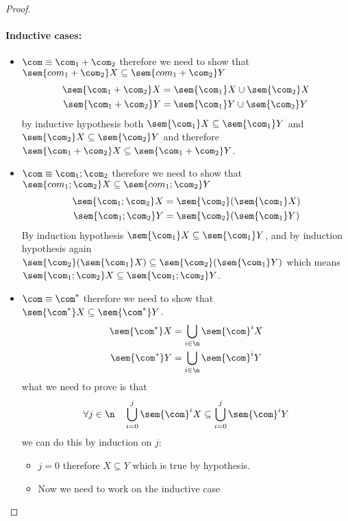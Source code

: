 \begin{proof}
  \paragraph*{Inductive cases: \\}
  \begin{itemize}
  \item \(\com \equiv \com_1 + \com_2\) therefore we need to show that
    \(\sem{com_1+\com_2}X \subseteq \sem{com_1+\com_2}Y \)
    \begin{align*}
      \sem{\com_1 + \com_2}X & = \sem{\com_1}X \cup \sem{\com_2}X \\
      \sem{\com_1 + \com_2}Y & = \sem{\com_1}Y \cup \sem{\com_2}Y \\
    \end{align*}
    by inductive hypothesis both
    \(\sem{\com_1}X \subseteq \sem{\com_1}Y\) and
    \(\sem{\com_2}X \subseteq \sem{\com_2}Y\) and therefore
    \(\sem{\com_1 + \com_2}X \subseteq \sem{\com_1 + \com_2}Y\).
  \item \(\com \equiv \com_1 ; \com_2\) therefore we need to show that
    \(\sem{com_1;\com_2}X \subseteq \sem{com_1;\com_2}Y \)
    \begin{align*}
      \sem{\com_1 ; \com_2}X & = \sem{\com_2}(\sem{\com_1}X) \\
      \sem{\com_1 ; \com_2}Y & = \sem{\com_2}(\sem{\com_1}Y) \\
    \end{align*}
    By induction hypothesis
    \(\sem{\com_1} X \subseteq \sem{\com_1}Y\), and by induction
    hypothesis again
    \(\sem{\com_2}(\sem{\com_1} X) \subseteq \sem{\com_2}(\sem{\com_1}
    Y)\) which means
    \(\sem{\com_1 ; \com_2} X \subseteq \sem{\com_1 ; \com_2}Y\).
  \item \(\com \equiv \com^*\) therefore we need to show that
    \(\sem{\com^*}X \subseteq \sem{\com^*}Y \).
    \begin{align*}
      \sem{\com^*}X & = \bigcup_{i\in\n}\sem{\com}^i X \\
      \sem{\com^*}Y & = \bigcup_{i\in\n}\sem{\com}^i Y
    \end{align*}
    what we need to prove is that
    \[\forall j \in \n \quad \bigcup_{i=0}^j\sem{\com}^i X \subseteq
      \bigcup_{i=0}^j\sem{\com}^i Y\]
    we can do this by induction on \(j\):
    \begin{itemize}
    \item \(j=0\) therefore \(X\subseteq Y\) which is true by
      hypothesis.
    \item Now we need to work on the inductive case

\end{itemize}
\end{itemize}
\end{proof}

